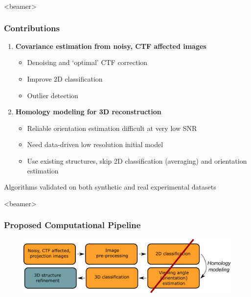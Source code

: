\documentclass{beamer}
\begin{document}
\begin{frame}<beamer>
\frametitle{Contributions}
\begin{enumerate}
\item \textbf{Covariance estimation from noisy, CTF affected images}
\begin{itemize}
\item Denoising and `optimal' CTF correction
\item Improve 2D classification
\item Outlier detection
\end{itemize}
\item \textbf{Homology modeling for 3D reconstruction}
\begin{itemize}
\item Reliable orientation estimation difficult at very low SNR
\item Need data-driven low resolution initial model
\item Use existing structures, \alert{skip 2D classification (averaging) and orientation estimation}
\end{itemize}
\end{enumerate}
Algorithms validated on both synthetic and real experimental datasets
\end{frame}

\begin{frame}<beamer>
\frametitle{Proposed Computational Pipeline}
\begin{figure}[h]
\centering
{\includegraphics[scale=0.35]{figures/cryoem_pipeline_ours.pdf}}\\
\label{fig:rawims}
\end{figure}
\end{frame}
\end{document}
